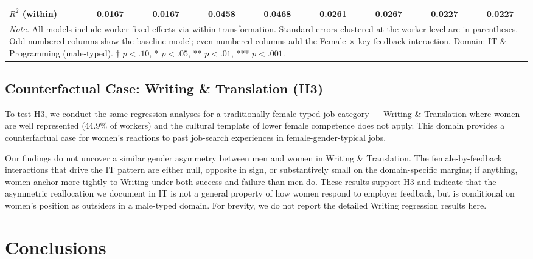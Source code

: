 \documentclass[12pt]{article}
\begin{document}
\begin{table}
\begin{tabular}{lcccccccc}
$R^2$ (within) & 0.0167 & 0.0167 & 0.0458 & 0.0468 & 0.0261 & 0.0267 & 0.0227 & 0.0227 \\
\hline\hline
\multicolumn{9}{p{0.95\textheight}}{
\footnotesize \textit{Note.} All models include worker fixed effects via within-transformation. Standard errors clustered at the worker level are in parentheses. Odd-numbered columns show the baseline model; even-numbered columns add the Female $\times$ key feedback interaction. Domain: IT \& Programming (male-typed). $\dagger$ $p < .10$, * $p < .05$, ** $p < .01$, *** $p < .001$.
} \\
\end{tabular}
\end{table}







\subsection{Counterfactual Case: Writing \& Translation (H3)}

To test H3, we conduct the same regression analyses for a traditionally female-typed job category --- Writing \& Translation where women are well represented (44.9\% of workers) and the cultural template of lower female competence does not apply. This domain provides a counterfactual case for women's reactions to past job-search experiences in female-gender-typical jobs.

Our findings do not uncover a similar gender asymmetry between men and women in Writing \& Translation. The female-by-feedback interactions that drive the IT pattern are either null, opposite in sign, or substantively small on the domain-specific margins; if anything, women anchor more tightly to Writing under both success and failure than men do. These results support H3 and indicate that the asymmetric reallocation we document in IT is not a general property of how women respond to employer feedback, but is conditional on women's position as outsiders in a male-typed domain. For brevity, we do not report the detailed Writing regression results here.








\section{Conclusions}
\end{document}
